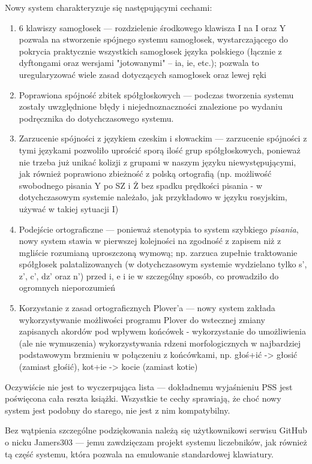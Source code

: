 \documentclass[12p, oneside]{book}
\begin{document}
Nowy system charakteryzuje się następującymi cechami:
\begin{enumerate}
	\item 6 klawiszy samogłosek --- rozdzielenie środkowego klawisza I na I
		oraz Y pozwala na stworzenie spójnego systemu samogłosek,
		wystarczającego do pokrycia praktycznie wszystkich samogłosek
		języka polskiego (łącznie z dyftongami oraz wersjami
		"jotowanymi" -- ia, ie, etc.); pozwala to uregularyzować wiele
		zasad dotyczących samogłosek oraz lewej ręki
	\item Poprawiona spójność zbitek spółgłoskowych --- podczas tworzenia
		systemu zostały uwzględnione błędy i niejednoznaczności
		znalezione po wydaniu podręcznika do dotychczasowego systemu.
	\item Zarzucenie spójności z językiem czeskim i słowackim --- zarzucenie
		spójności z tymi językami pozwoliło uprościć sporą ilość grup
		spółgłoskowych, ponieważ nie trzeba już unikać kolizji z grupami
		w naszym języku niewystępującymi, jak również poprawiono
		zbieżność z polską ortografią (np. możliwość swobodnego pisania
		Y po SZ i Ż bez spadku prędkości pisania - w dotychczasowym
		systemie należało, jak przykładowo w języku rosyjskim, używać w
		takiej sytuacji I)
	\item Podejście ortograficzne --- ponieważ stenotypia to system
		szybkiego \emph{pisania}, nowy system stawia w pierwszej
		kolejności na zgodność z zapisem niż z mgliście rozumianą
		uproszczoną wymową; np. zarzuca zupełnie traktowanie spółgłosek
		palatalizowanych (w dotychczasowym systemie wydzielano tylko s',
		z', c', dz' oraz n') przed i, e i ie w szczególny sposób, co
		prowadziło do ogromnych nieporozumień
	\item Korzystanie z zasad ortograficznych Plover'a --- nowy system
		zakłada wykorzystywanie możliwości programu Plover do wstecznej
		zmiany zapisanych akordów pod wpływem końcówek - wykorzystanie
		do umożliwienia (ale nie wymuszenia) wykorzystywania rdzeni
		morfologicznych w najbardziej podstawowym brzmieniu w połączeniu
		z końcówkami, np. głoś+ić -> głosić (zamiast głośić), kot+ie ->
		kocie (zamiast kotie)
\end{enumerate}
Oczywiście nie jest to wyczerpująca lista --- dokładnemu wyjaśnieniu PSS jest
poświęcona cała reszta książki. Wszystkie te cechy sprawiają, że choć nowy
system jest podobny do starego, nie jest z nim kompatybilny.

Bez wątpienia szczególne podziękowania należą się użytkownikowi serwisu GitHub o nicku
Jamers303 --- jemu zawdzięczam projekt systemu liczebników, jak również
tą część systemu, która pozwala na emulowanie standardowej klawiatury.
\end{document}
